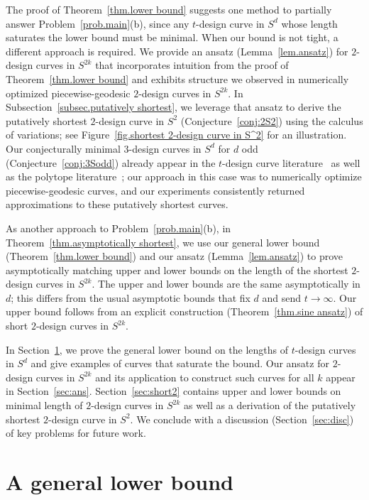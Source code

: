\documentclass[12pt]{article}
\theoremstyle{plain}
\theoremstyle{definition}
\theoremstyle{remark}
\begin{document}
The proof of Theorem~\ref{thm.lower bound} suggests one method to partially answer Problem~\ref{prob.main}(b), since any $t$-design curve in $S^d$ whose length saturates the lower bound must be minimal.
When our bound is not tight, a different approach is required.
We provide an ansatz (Lemma~\ref{lem.ansatz}) for $2$-design curves in $S^{2k}$ that incorporates intuition from the proof of Theorem~\ref{thm.lower bound} and exhibits structure we observed in numerically optimized piecewise-geodesic $2$-design curves in $S^{2k}$.
In Subsection~\ref{subsec.putatively shortest}, we leverage that ansatz to derive the putatively shortest $2$-design curve in $S^2$ (Conjecture~\ref{conj:2S2}) using the calculus of variations; see Figure~\ref{fig.shortest 2-design curve in S^2} for an illustration.
Our conjecturally minimal $3$-design curves in $S^d$ for $d$ odd (Conjecture~\ref{conj:3Sodd}) already appear in the $t$-design curve literature~\cite{EhlerGK:25,Lindblad:24} as well as the polytope literature~\cite{BarvinokN:08,Novik:23,Smilansky:85,Smilansky:90}; our approach in this case was to numerically optimize piecewise-geodesic curves, and our experiments consistently returned approximations to these putatively  shortest curves. 


As another approach to Problem~\ref{prob.main}(b), in Theorem~\ref{thm.asymptotically shortest}, we use our general lower bound (Theorem~\ref{thm.lower bound}) and our ansatz (Lemma~\ref{lem.ansatz}) to prove asymptotically matching upper and lower bounds on the length of the shortest $2$-design curves in $S^{2k}$.
The upper and lower bounds are the same asymptotically in $d$; this differs from the usual asymptotic bounds that fix $d$ and send $t\to\infty$.
Our upper bound follows from an explicit construction (Theorem~\ref{thm.sine ansatz}) of short $2$-design curves in $S^{2k}$.

In Section~\ref{sec:genlowbd}, we prove the general lower bound on the lengths of $t$-design curves in $S^d$ and give examples of curves that saturate the bound.
Our ansatz for $2$-design curves in $S^{2k}$ and its application to construct such curves for all $k$ appear in Section~\ref{sec:ans}.
Section~\ref{sec:short2} contains upper and lower bounds on minimal length of $2$-design curves in $S^{2k}$ as well as a derivation of the putatively shortest $2$-design curve in $S^2$.
We conclude with a discussion (Section~\ref{sec:disc}) of key problems for future work.

\section{A general lower bound}\label{sec:genlowbd}
\end{document}
